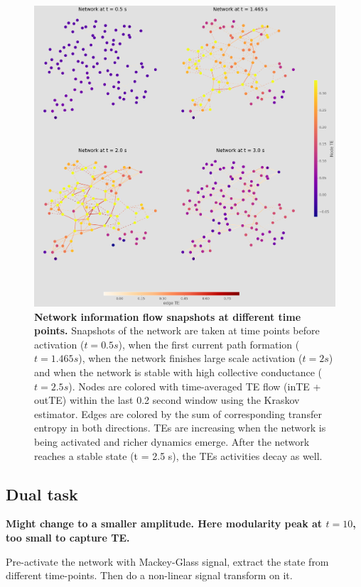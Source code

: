 \documentclass[%
 reprint,
 amsmath,amssymb,
 aps,
]{revtex4-2}
\begin{document}
\begin{figure}[h]
	\centering
	\includegraphics[width = 0.8\paperwidth]{figure/time_network_comparison}
	\caption{\textbf{Network information flow snapshots at different time points.}
			Snapshots of the network are taken at time points before activation ($t = 0.5s$), when the first current path formation ($t=1.465s$), when the network finishes large scale activation ($t = 2s$) and when the network is stable with high collective conductance ($t = 2.5s$).
			Nodes are colored with time-averaged TE flow (inTE + outTE) within the last 0.2 second window using the Kraskov estimator. Edges are colored by the sum of corresponding transfer entropy in both directions. TEs are increasing when the network is being activated and richer dynamics emerge. After the network reaches a stable state (t = 2.5 s), the TEs activities decay as well.}
	\label{fig:network_comparison}
\end{figure}




\subsection{Dual task}
\textbf{Might change to a smaller amplitude. Here modularity peak at $t=10$, too small to capture TE.}

Pre-activate the network with Mackey-Glass signal, extract the state from different time-points. Then do a non-linear signal transform on it. 
\end{document}

